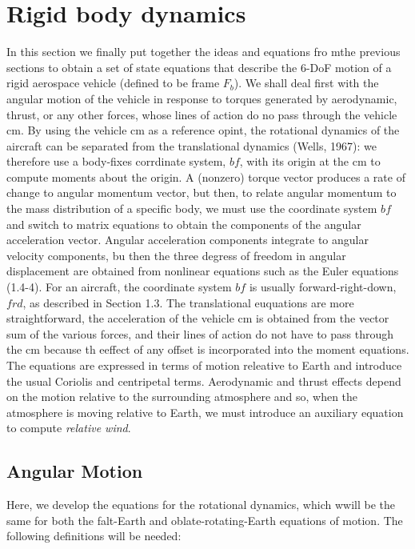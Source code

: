 \section{Rigid body dynamics}

In this section we finally put together the ideas and equations fro mthe previous sections to obtain a set of state equations that describe the 6-DoF motion of a rigid aerospace vehicle (defined to be frame \({F}_{b}\)). We shall deal first with the angular motion of the vehicle in response to torques generated by aerodynamic, thrust, or any other forces, whose lines of action do no pass through the vehicle cm. By using the vehicle cm as a reference opint, the rotational dynamics of the aircraft can be separated from the translational dynamics (Wells, 1967): we therefore use a body-fixes corrdinate system, \(bf\), with its origin at the cm to compute moments about the origin. A (nonzero) torque vector produces a rate of change to angular momentum vector, but then, to relate angular momentum to the mass distribution of a specific body, we must use the coordinate system \(bf\) and switch to matrix equations to obtain the components of the angular acceleration vector. Angular acceleration components integrate to angular velocity components, bu then the three degress of freedom in angular displacement are obtained from nonlinear equations such as the Euler equations (1.4-4). For an aircraft, the coordinate system \(bf\) is usually forward-right-down, \(frd\), as described in Section 1.3.
The translational euquations are more straightforward, the acceleration of the vehicle cm is obtained from the vector sum of the various forces, and their lines of action do not have to pass through the cm because th eeffect of any offset is incorporated into the moment equations. The equations are expressed in terms of motion releative to Earth and introduce the usual Coriolis and centripetal terms. Aerodynamic and thrust effects depend on the motion relative to the surrounding atmosphere and so, when the atmosphere is moving relative to Earth, we must introduce an auxiliary equation to compute \emph{relative wind}.

\subsection{Angular Motion}

Here, we develop the equations for the rotational dynamics, which wwill be the same for both the falt-Earth and oblate-rotating-Earth equations of motion. The following definitions will be needed:

